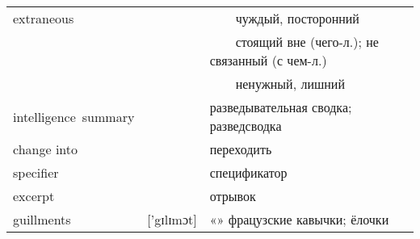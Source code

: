 \documentclass[14pt,a4paper]{article}
\newcommand{\tabitem}{~~\llap{\textbullet}~~}
\begin{document}
{
\linespread{3}
\renewcommand\arraystretch{1}

\fontsize{12pt}{5.5pt}\selectfont
{}\selectfont

\begin{tabularx}{\textwidth}{| m{4cm} | m{3cm} | X |}
 \hline
extraneous & & \tabitem чуждый, посторонний\\
& & \tabitem стоящий вне (чего-л.); не связанный (с чем-л.)\\
& & \tabitem ненужный, лишний\\ \hline 
 intelligence~summary & & разведывательная сводка; разведсводка\\ \hline
 change into & & переходить\\ \hline
 specifier & & спецификатор\\ \hline
 excerpt & & отрывок\\ \hline
 guillments & ['gɪlɪmɔt] & «» фрацузские кавычки; ёлочки\\ \hline

\end{tabularx}}
\end{document}
